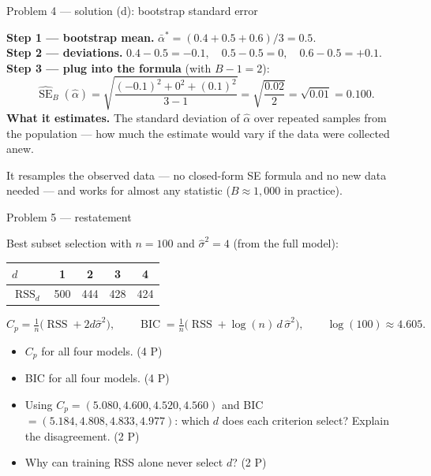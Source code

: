 \documentclass[aspectratio=169,11pt]{beamer}
\begin{document}
\begin{frame}{Problem 4 --- solution (d): bootstrap standard error}
  \begin{solutionbox}
    \textbf{Step 1 --- bootstrap mean.}\quad
    $\bar{\alpha}^{*}=(0.4+0.5+0.6)/3=0.5.$\\[0.5mm]
    \textbf{Step 2 --- deviations.}\quad
    $0.4-0.5=-0.1,\quad 0.5-0.5=0,\quad 0.6-0.5=+0.1.$\\[0.5mm]
    \textbf{Step 3 --- plug into the formula} (with $B-1=2$):
    \[
      \widehat{\operatorname{SE}}_B(\hat{\alpha})
      =\sqrt{\frac{(-0.1)^2+0^2+(0.1)^2}{3-1}}
      =\sqrt{\frac{0.02}{2}}
      =\sqrt{0.01}=\mathbf{0.100}.
    \]
    \textbf{What it estimates.} The standard deviation of $\hat{\alpha}$ over repeated
    samples from the population --- how much the estimate would vary if the data were
    collected anew.
  \end{solutionbox}
  \begin{takeaway}
    It resamples the observed data --- no closed-form SE formula and no new data needed ---
    and works for almost any statistic ($B\approx 1{,}000$ in practice).
  \end{takeaway}
\end{frame}

\begin{frame}{Problem 5 --- restatement}
  \begin{exercise}
    Best subset selection with $n=100$ and $\hat{\sigma}^2=4$ (from the full model):
    \begin{center}
    \begin{tabular}{lcccc}
      \toprule
      $d$ & 1 & 2 & 3 & 4\\
      \midrule
      $\operatorname{RSS}_d$ & 500 & 444 & 428 & 424\\
      \bottomrule
    \end{tabular}
    \end{center}
    \[
    C_p=\tfrac{1}{n}\bigl(\operatorname{RSS}+2d\hat{\sigma}^2\bigr),\qquad
    \operatorname{BIC}=\tfrac{1}{n}\bigl(\operatorname{RSS}+\log(n)\,d\,\hat{\sigma}^2\bigr),
    \qquad \log(100)\approx 4.605 .
    \]
    \begin{itemize}
      \item[(a)] $C_p$ for all four models. \hfill (4 P)
      \item[(b)] BIC for all four models. \hfill (4 P)
      \item[(c)] Using $C_p=(5.080,4.600,4.520,4.560)$ and
        BIC$=(5.184,4.808,4.833,4.977)$: which $d$ does each criterion select? Explain the
        disagreement. \hfill (2 P)
      \item[(d)] Why can training RSS alone never select $d$? \hfill (2 P)
    \end{itemize}
  \end{exercise}
\end{frame}
\end{document}
